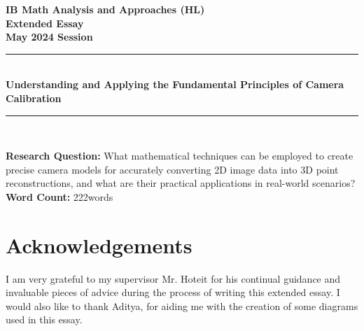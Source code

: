 \documentclass[12pt, oneside]{article}
\providecommand{\wordcount}{222}
\begin{document}
\pagestyle{normal}

\begin{titlepage}
    \large

    \begin{center}

        \vspace*{2cm}

        {\bfseries
            IB Math Analysis and Approaches (HL) \\
            Extended Essay\\
            May 2024 Session}\\

        \vspace*{\fill}

        \rule{\linewidth}{1.5pt} \\ [0.5cm]
        {\LARGE \bfseries Understanding and Applying the Fundamental Principles of Camera Calibration}
        \rule{\linewidth}{0.5pt} \\

        \vspace*{\fill}

        \textbf{Research Question:} What mathematical techniques can be employed to create precise camera models for accurately converting 2D image data into 3D point reconstructions, and what are their practical applications in real-world scenarios? \\ [1cm]

        \textbf{Word Count:} \wordcount \space words

        \vspace*{2cm}

    \end{center}

\end{titlepage}

\thispagestyle{empty}
\tableofcontents
\clearpage
{}
\setcounter{page}{1}









\section*{Acknowledgements}

I am very grateful to my supervisor Mr. Hoteit for his continual guidance and invaluable pieces of advice during the process of writing this extended essay. I would also like to thank Aditya, for aiding me with the creation of some diagrams used in this essay. 

\printbibliography[heading=bibintoc]{}
\end{document}

